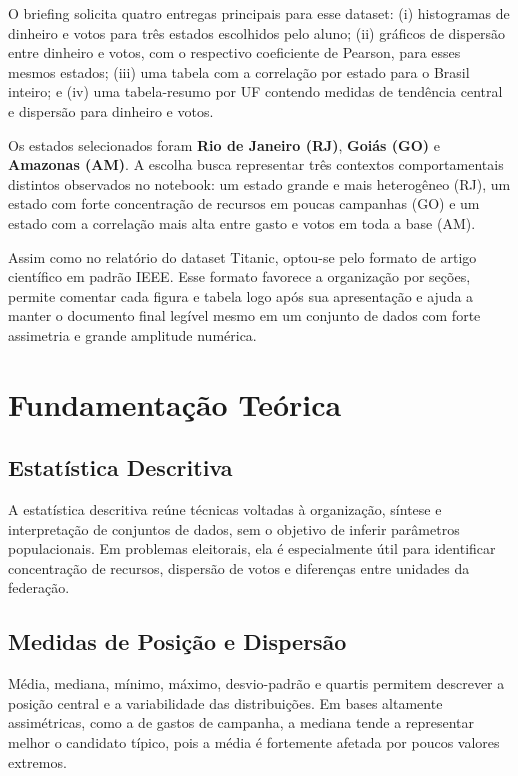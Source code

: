 \documentclass[conference]{IEEEtran}
\begin{document}
O briefing solicita quatro entregas principais para esse dataset: (i)
histogramas de dinheiro e votos para três estados escolhidos pelo aluno;
(ii) gráficos de dispersão entre dinheiro e votos, com o respectivo
coeficiente de Pearson, para esses mesmos estados; (iii) uma tabela com a
correlação por estado para o Brasil inteiro; e (iv) uma tabela-resumo por
UF contendo medidas de tendência central e dispersão para dinheiro e votos.

Os estados selecionados foram \textbf{Rio de Janeiro (RJ)}, \textbf{Goiás
(GO)} e \textbf{Amazonas (AM)}. A escolha busca representar três contextos
comportamentais distintos observados no notebook: um estado grande e mais
heterogêneo (RJ), um estado com forte concentração de recursos em poucas
campanhas (GO) e um estado com a correlação mais alta entre gasto e votos
em toda a base (AM).

Assim como no relatório do dataset Titanic, optou-se pelo formato de artigo
científico em padrão IEEE. Esse formato favorece a organização por seções,
permite comentar cada figura e tabela logo após sua apresentação e ajuda a
manter o documento final legível mesmo em um conjunto de dados com forte
assimetria e grande amplitude numérica.

\section{Fundamentação Teórica}

\subsection{Estatística Descritiva}

A estatística descritiva reúne técnicas voltadas à organização, síntese e
interpretação de conjuntos de dados, sem o objetivo de inferir parâmetros
populacionais. Em problemas eleitorais, ela é especialmente útil para
identificar concentração de recursos, dispersão de votos e diferenças entre
unidades da federação.

\subsection{Medidas de Posição e Dispersão}

Média, mediana, mínimo, máximo, desvio-padrão e quartis permitem descrever a
posição central e a variabilidade das distribuições. Em bases altamente
assimétricas, como a de gastos de campanha, a mediana tende a representar
melhor o candidato típico, pois a média é fortemente afetada por poucos
valores extremos.
\end{document}
